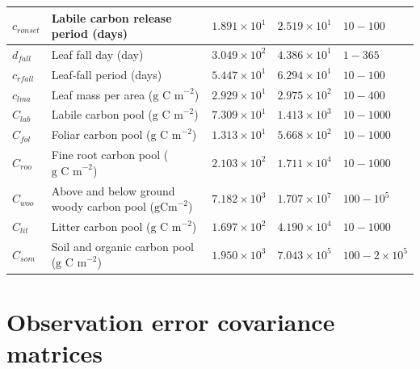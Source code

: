 \documentclass[12pt]{article}
\begin{document}
\begin{table}[ht]
\begin{center}
\begin{tabular}{| l | p{} | p{2cm} | p{2cm} | p{2cm} |}
$c_{ronset}$ & Labile carbon release period (days) & $1.891\times 10^{1}$ & $2.519\times 10^{1}$ & $10 - 100$ \\ \hline
$d_{fall}$ & Leaf fall day (day) & $3.049\times 10^{2}$ & $4.386\times 10^{1}$ & $1 - 365$ \\ \hline
$c_{rfall}$ & Leaf-fall period (days) & $5.447\times 10^{1}$ & $6.294\times 10^{1}$ & $10 - 100$ \\ \hline
$c_{lma}$ & Leaf mass per area ($\text{g C m}^{-2}$) & $2.929\times 10^{1}$ & $2.975\times 10^{2}$ & $10 - 400$ \\ \hline
$C_{lab}$ & Labile carbon pool ($\text{g C m}^{-2}$) & $7.309\times 10^{1}$ & $1.413\times 10^{3}$ & $10 - 1000$ \\ \hline
$C_{fol}$ & Foliar carbon pool ($\text{g C m}^{-2}$) & $1.313\times 10^{1}$ & $5.668\times 10^{2}$ & $10 - 1000$ \\ \hline
$C_{roo}$ & Fine root carbon pool ($\text{g C m}^{-2}$) & $2.103\times 10^{2}$ & $1.711\times 10^{4}$ & $10 - 1000$ \\ \hline
$C_{woo}$ & Above and below ground woody carbon pool ($\text{gCm}^{-2}$) & $7.182\times 10^{3}$ & $1.707\times 10^{7}$ & $100 - 10^{5}$ \\ \hline
$C_{lit}$ & Litter carbon pool ($\text{g C m}^{-2}$) & $1.697\times 10^{2}$ & $4.190\times 10^{4}$ & $10 - 1000$ \\ \hline
$C_{som}$ & Soil and organic carbon pool ($\text{g C m}^{-2}$) & $1.950\times 10^{3}$ & $7.043\times 10^{5}$ & $100 - 2 \times 10^{5}$  \\ \hline
	\end{tabular}
	\label{table:xbvars}
\end{center} 
\end{table}

\section{Observation error covariance matrices}
\end{document}
